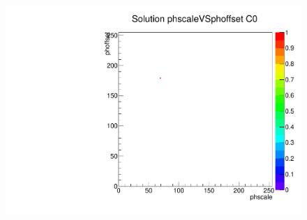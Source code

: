 \begin{figure}[!Hp]
\centering
\begin{minipage}{0.45\textwidth}
  \includegraphics[width=1.0\textwidth]{figures/phopt_solphvsdacdac_th2.pdf}
  \caption{}
  \label{fig:phopt_solphvsdacdac_th2}
\end{minipage}
\end{figure}



